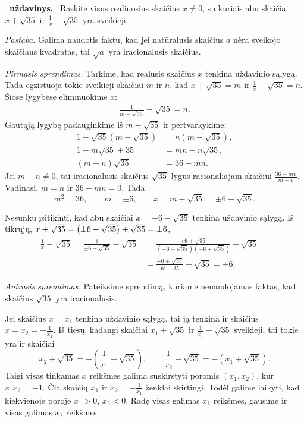 \documentclass[11pt,a4paper]{article}
\newcommand{\hm}[1]{\nobreak\hspace{0pt}#1\nobreak\hspace{0pt}}
\newcounter{uzdavinys}
\newenvironment{uzdavinys}
  {\refstepcounter{uzdavinys}\par\medskip\noindent\textbf{\theuzdavinys\ uždavinys.}\ }
  {\par\medskip}
\begin{document}
\begin{uzdavinys} 
Raskite visus realiuosius skaičius $x\neq 0$, su kuriais abu skaičiai $x+\sqrt{35}$ ir $\frac{1}{x}-\sqrt{35}$ 
 yra sveikieji.
 
 {\it Pastaba.} Galima naudotis faktu, kad jei natūralusis
skaičius $a$ nėra sveikojo skaičiaus kvadratas, tai $\sqrt{a}$ yra iracionalusis skaičius.
\end{uzdavinys}

\textit{Pirmasis sprendimas.} 
Tarkime, kad realusis skaičius $x$ tenkina uždavinio sąlygą. Tada egzistuoja tokie sveikieji skaičiai $m$ ir 
$n$, kad $x+\sqrt{35} = m$ ir $\frac{1}{x}-\sqrt{35} = n$. Šiose lygybėse eliminuokime $x$: 
\begin{align*}
\frac{1}{m-\sqrt{35}}-\sqrt{35} = n.
\end{align*}
Gautąją lygybę padauginkime iš $m-\sqrt{35}$ ir pertvarkykime:
\begin{align*}
1-\sqrt{35}\left(m-\sqrt{35}\right) &= n\left(m-\sqrt{35}\right),\\ 1-m\sqrt{35}+35&=mn-n\sqrt{35},\\
(m-n)\sqrt{35} &= 36-mn.\end{align*}
Jei $m-n\neq 0$, tai iracionalusis skaičius $\sqrt{35}$ lygus racionaliajam skaičiui $\frac{36-mn}{m-n}$. Vadinasi, $m=n$ ir $36-mn=0$. Tada $$m^2=36,\qquad m= \pm 6,\qquad x =m-\sqrt{35}= \pm 6 - \sqrt{35}.$$

Nesunku įsitikinti, kad abu skaičiai $x = \pm 6 - \sqrt{35}$ tenkina uždavinio sąlygą. Iš tikrųjų,
$x+ \sqrt{35} \hm= \left(\pm 6 - \sqrt{35}\right) + \sqrt{35} = \pm 6$,
 \begin{align*}
\frac{1}{x} - \sqrt{35} = \frac{1}{\pm 6-\sqrt{35}}-\sqrt{35} &= \frac{\pm 6+\sqrt{35}}{\left(\pm 6-\sqrt{35}\right)\left(\pm 6+\sqrt{35}\right)}-\sqrt{35} =\\
&= \frac{\pm 6+\sqrt{35}}{6^2 - 35}-\sqrt{35} = \pm 6.
\end{align*}
 \vspace{0mm}

\textit{Antrasis sprendimas.} Pateiksime sprendimą, kuriame nenaudojamas faktas, kad skaičius $\sqrt{35}$ yra iracionalusis.

Jei skaičius $x=x_1$ tenkina uždavinio sąlygą, tai ją tenkina ir 
skaičius $x=x_2=-\frac{1}{x_1}$. Iš tiesų, kadangi skaičiai $x_1+\sqrt{35}$ ir $\frac{1}{x_1}-\sqrt{35}$ sveikieji, tai tokie yra ir skaičiai
\begin{equation*}
x_2+ \sqrt{35}= -\left(\frac{1}{x_1} - \sqrt{35} \right),\qquad
\frac{1}{x_2} - \sqrt{35} = -\left(x_1 + \sqrt{35} \right).
\end{equation*}
Taigi visas tinkamas $x$ reikšmes galima suskirstyti poromis $(x_1, x_2)$, kur $x_1x_2=-1$. Čia skaičių $x_1$ ir $x_2=-\frac1{x_1}$ ženklai skirtingi. Todėl galime laikyti, kad kiekvienoje poroje $x_1>0$, $x_2<0$. Radę visas galimas $x_1$ reikšmes, gausime ir visas galimas $x_2$ reikšmes.
\end{document}
